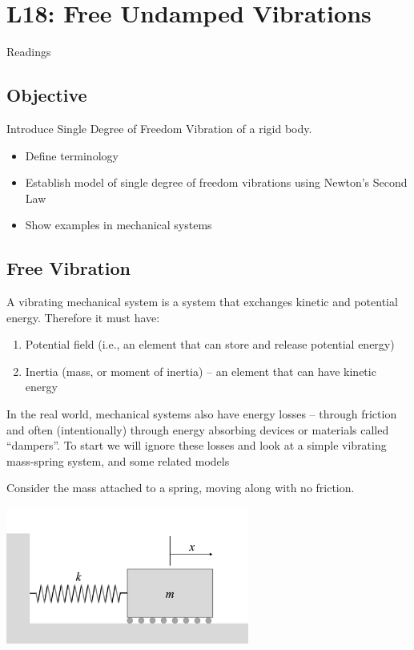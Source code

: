 \documentclass[12pt,letterpaper,twoside]{report}
\begin{document}
\chapter{L18: Free Undamped Vibrations}
Readings

\section{Objective}
Introduce Single Degree of Freedom Vibration of a rigid body. 
\begin{itemize}
\item Define terminology
\item Establish model of single degree of freedom vibrations using Newton’s Second Law
\item Show examples in mechanical systems
\end{itemize}

\section{Free Vibration}
A vibrating mechanical system is a system that exchanges kinetic and potential energy.  Therefore it must have:
\begin{enumerate}
\item Potential field (i.e., an element that can store and release potential energy)
\item Inertia (mass, or moment of inertia) – an element that can have kinetic energy
\end{enumerate}

In the real world, mechanical systems also have energy losses – through friction and often (intentionally) through energy absorbing devices or materials called “dampers”.  To start we will ignore these losses and look at a simple vibrating mass-spring system, and some related models

\vspace*{10\baselineskip}

Consider the mass attached to a spring, moving along with no friction.

\includegraphics[trim={1cm 1cm 2cm 3cm},clip,width=0.6\textwidth, left]{Slide74}
\end{document}
